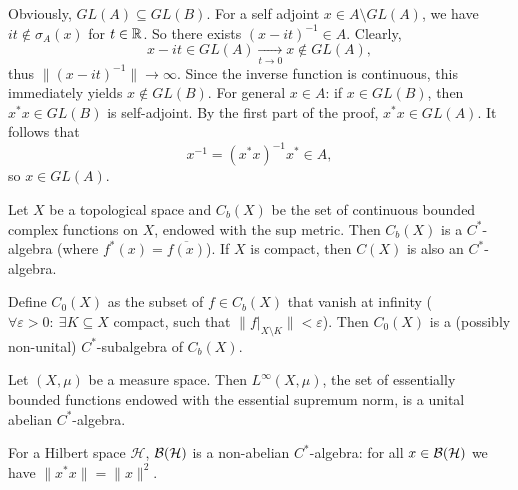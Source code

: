 \begin{myproof}
  Obviously, $GL (A) \subseteq GL(B)$. For a self adjoint $x \in A \setminus GL(A)$, we have
  $it \notin \sigma_A (x)$ for $t \in \mathbb {R}$. So there exists $(x - it)^{-1} \in A$.
  Clearly, $$x - it \in GL(A) \xrightarrow[t \to 0]{} x \notin GL(A),$$
  thus $\| (x - it)^{-1}\| \to \infty$. Since the inverse function is continuous,
  this immediately yields $x \notin GL (B)$.
  For general $x \in A$: if $x \in GL(B)$, then $x^* x \in GL(B)$ 
  is self-adjoint. By the first part of the proof, $x^* x \in GL(A)$.
  It follows that 
  \begin{equation*}
    x^{-1} = (x^* x)^{-1} x^* \in A,
  \end{equation*}
  so $x \in GL(A)$.
\end{myproof}

\begin{example}
  Let $X$ be a topological space and $C_b (X)$ be the set of continuous bounded complex functions on $X$,
  endowed with the sup metric. Then $C_b (X)$ is a $C^*$-algebra (where $f^*(x) = \overline{f(x)}$).
  If $X$ is compact, then $C(X)$ is also an $C^*$-algebra.
\end{example}

\begin{example}
  Define $C_0 (X)$ as the subset of $f \in C_b (X)$
  that vanish at infinity ($\forall \varepsilon > 0:\ \exists K \subseteq X$ compact, such that $\|f\big|_{X \setminus K}\| < \varepsilon$).
  Then $C_0 (X)$ is a (possibly non-unital) $C^*$-subalgebra of $C_b (X)$. 
\end{example}

\begin{example}
  Let $(X, \mu)$ be a measure space.
  Then $L^\infty (X, \mu)$, the set of essentially bounded functions endowed with the essential supremum norm, is a unital abelian $C^*$-algebra.
\end{example}

\begin{example}
  For a Hilbert space $\mathcal{H}$, $\operatorname{\mathcal{B} (\mathcal{H})}$ is a non-abelian $C^*$-algebra:
  for all $x \in \operatorname{\mathcal{B} (\mathcal{H})}$ we have $\| x^* x\| = \|x\|^2$.
\end{example}

